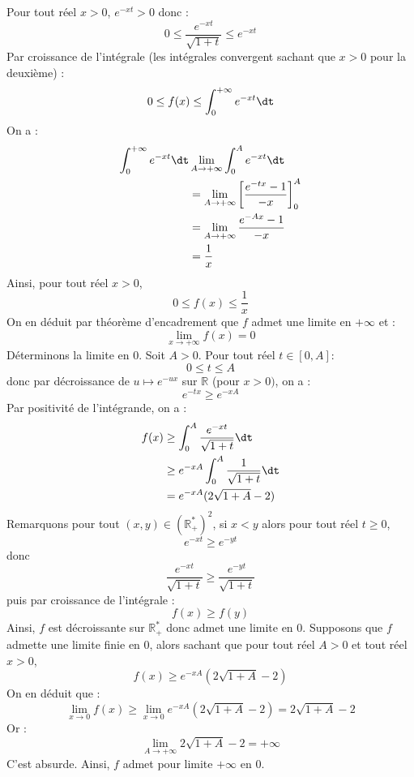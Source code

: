 \documentclass[a4paper,10pt]{report}
\begin{document}
\begin{enumerate}
Pour tout réel $x>0$, $e^{-xt} > 0$ donc :
$$  0 \leq \dfrac{e^{-xt}}{\sqrt{1+t}} \leq e^{-xt}$$
Par croissance de l'intégrale (les intégrales convergent sachant que $x>0$ pour la deuxième) :
$$ 0 \leq f(x) \leq \int_0^{+ \infty} e^{-xt} \dt$$
On a :
\begin{align*}
\int_0^{+ \infty} e^{-xt} \dt & \lim_{A \rightarrow + \infty} \int_0^{A} e^{-xt} \dt \\
& = \lim_{A \rightarrow + \infty} \left[ \dfrac{e^{-tx}-1}{-x} \right]_0^A \\
&  = \lim_{A \rightarrow + \infty} \dfrac{e^{-Ax}-1}{-x} \\
& = \dfrac{1}{x}
\end{align*}
Ainsi, pour tout réel $x>0$,
$$ 0 \leq f(x) \leq \dfrac{1}{x}$$
On en déduit par théorème d'encadrement que $f$ admet une limite en $+ \infty$ et :
$$ \lim_{x \rightarrow + \infty} f(x) = 0$$
Déterminons la limite en $0$. Soit $A >0$. Pour tout réel $t \in [0,A]$:
$$ 0 \leq t \leq A$$
donc par décroissance de $u \mapsto e^{-ux}$ sur $\mathbb{R}$ (pour $x>0)$, on a :
$$  e^{-tx} \geq  e^{-xA}$$
Par positivité de l'intégrande, on a :
\begin{align*}
 f(x) & \geq \int_0^{A} \dfrac{e^{-xt}}{\sqrt{1+t}}  \dt  \\
 & \geq e^{-xA} \int_0^A \dfrac{1}{\sqrt{1+t}}  \dt  \\ 
 & = e^{-xA} (2 \sqrt{1+A}-2) 
\end{align*}
Remarquons pour tout $(x,y) \in (\mathbb{R}_+^*)^2$, si $x<y$ alors pour tout réel $t \geq 0$,
$$ e^{-xt} \geq e^{-yt}$$
donc 
$$ \dfrac{e^{-xt}}{\sqrt{1+t}} \geq \dfrac{e^{-yt}}{\sqrt{1+t}}$$
puis par croissance de l'intégrale :
$$ f(x) \geq f(y)$$
Ainsi, $f$ est décroissante sur $\mathbb{R}_+^*$ donc admet une limite en $0$. Supposons que $f$ admette une limite finie en $0$, alors sachant que pour tout réel $A>0$ et tout réel $x>0$,
$$ f(x) \geq  e^{-xA} (2 \sqrt{1+A}-2) $$
On en déduit que :
$$ \lim_{x \rightarrow 0} f(x) \geq \lim_{x \rightarrow 0} e^{-xA} (2 \sqrt{1+A}-2) = 2 \sqrt{1+A}-2$$
Or :
$$ \lim_{A \rightarrow + \infty} 2 \sqrt{1+A}-2 = + \infty$$
C'est absurde. Ainsi, $f$ admet pour limite $+ \infty$ en $0$.
\end{enumerate}
\end{document}

